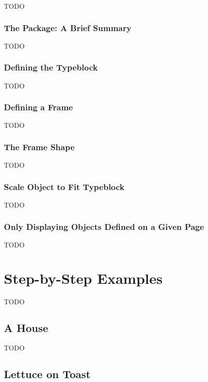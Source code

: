 TODO


\subsection{The  Package: A Brief Summary}
\label{sec:flowframesummary}

TODO


\subsection{Defining the Typeblock}\label{sec:typeblock}

TODO


\subsection{Defining a Frame}\label{sec:framedef}

TODO


\subsection{The Frame Shape}\label{sec:frameshape}

TODO


\subsection{Scale Object to Fit Typeblock}\label{sec:scaletotypeblock}

TODO


\subsection{Only Displaying Objects Defined on a Given Page}\label{sec:displaypage}

TODO


\chapter{Step-by-Step Examples}\label{sec:tutorials}

TODO


\section{A House}\label{sec:houseexample}

TODO


\section{Lettuce on Toast}\label{sec:toastexample}

